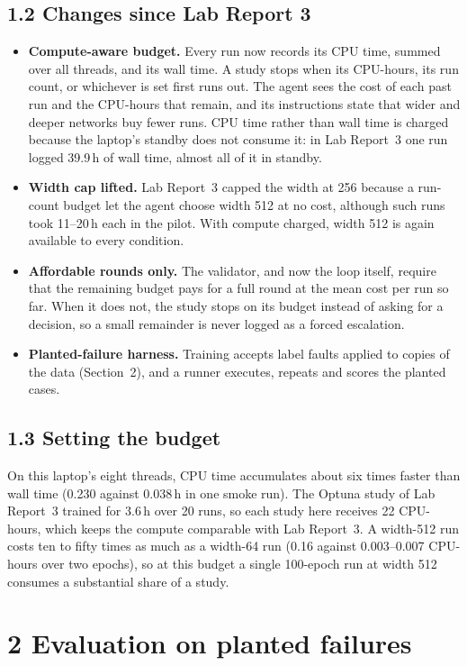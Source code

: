 \documentclass[11pt]{article}
\begin{document}
\subsection*{1.2 \quad Changes since Lab Report 3}
\begin{itemize}
\item \textbf{Compute-aware budget.} Every run now records its CPU time, summed over all threads,
  and its wall time. A study stops when its CPU-hours, its run count, or whichever is set first
  runs out. The agent sees the cost of each past run and the CPU-hours that remain, and its
  instructions state that wider and deeper networks buy fewer runs. CPU time rather than wall
  time is charged because the laptop's standby does not consume it: in Lab Report~3 one run
  logged 39.9\,h of wall time, almost all of it in standby.
\item \textbf{Width cap lifted.} Lab Report~3 capped the width at 256 because a run-count budget
  let the agent choose width 512 at no cost, although such runs took 11--20\,h each in the
  pilot. With compute charged, width 512 is again available to every condition.
\item \textbf{Affordable rounds only.} The validator, and now the loop itself, require that the
  remaining budget pays for a full round at the mean cost per run so far. When it does not, the
  study stops on its budget instead of asking for a decision, so a small remainder is never
  logged as a forced escalation.
\item \textbf{Planted-failure harness.} Training accepts label faults applied to copies of the
  data (Section~2), and a runner executes, repeats and scores the planted cases.
\end{itemize}

\subsection*{1.3 \quad Setting the budget}
On this laptop's eight threads, CPU time accumulates about six times faster than wall time
(0.230 against 0.038\,h in one smoke run). The Optuna study of Lab Report~3 trained for 3.6\,h
over 20 runs, so each study here receives 22 CPU-hours, which keeps the compute comparable
with Lab Report~3. A width-512 run costs ten to fifty times as much as a width-64 run (0.16
against 0.003--0.007 CPU-hours over two epochs), so at this budget a single 100-epoch run at
width 512 consumes a substantial share of a study.

\section*{2 \quad Evaluation on planted failures}
\end{document}
